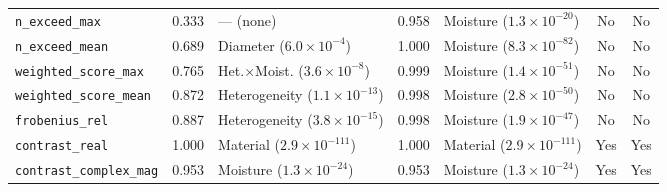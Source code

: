 \begin{table}[t]
\begin{tabular}{lcl cl cc}
\texttt{n\_exceed\_max} & 0.333 & --- (none) & 0.958 & Moisture ($1.3\times10^{-20}$) & No & No\\
\texttt{n\_exceed\_mean} & 0.689 & Diameter ($6.0\times10^{-4}$) & 1.000 & Moisture ($8.3\times10^{-82}$) & No & No\\
\texttt{weighted\_score\_max} & 0.765 & Het.$\times$Moist. ($3.6\times10^{-8}$) & 0.999 & Moisture ($1.4\times10^{-51}$) & No & No\\
\texttt{weighted\_score\_mean} & 0.872 & Heterogeneity ($1.1\times10^{-13}$) & 0.998 & Moisture ($2.8\times10^{-50}$) & No & No\\
\texttt{frobenius\_rel} & 0.887 & Heterogeneity ($3.8\times10^{-15}$) & 0.998 & Moisture ($1.9\times10^{-47}$) & No & No\\
\texttt{contrast\_real} & 1.000 & Material ($2.9\times10^{-111}$) & 1.000 & Material ($2.9\times10^{-111}$) & Yes & Yes\\
\texttt{contrast\_complex\_mag} & 0.953 & Moisture ($1.3\times10^{-24}$) & 0.953 & Moisture ($1.3\times10^{-24}$) & Yes & Yes\\
\hline
\end{tabular}
\end{table}
